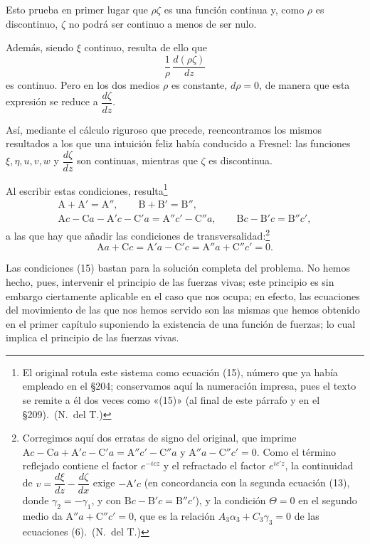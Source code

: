 Esto prueba en primer lugar que $\rho\zeta$ es una función continua y,
como $\rho$ es discontinuo, $\zeta$ no podrá ser continuo a menos de ser
nulo.

Además, siendo $\xi$ continuo, resulta de ello que
\[
\frac{1}{\rho}\,\frac{d(\rho\zeta)}{dz}
\]
es continuo. Pero en los dos medios $\rho$ es constante, $d\rho=0$, de
manera que esta expresión se reduce a $\dfrac{d\zeta}{dz}$.

Así, mediante el cálculo riguroso que precede, reencontramos los mismos
resultados a los que una intuición feliz había conducido a Fresnel: las
funciones $\xi,\eta,u,v,w$ y $\dfrac{d\zeta}{dz}$ son continuas, mientras
que $\zeta$ es discontinua.

Al escribir estas condiciones, resulta\footnote{El original rotula este
sistema como ecuación (15), número que ya había empleado en el §204;
conservamos aquí la numeración impresa, pues el texto se remite a él dos
veces como «(15)» (al final de este párrafo y en el §209).~(N.~del T.)}
\begin{equation}
\begin{gathered}
\mathrm{A}+\mathrm{A}'=\mathrm{A}'',\qquad \mathrm{B}+\mathrm{B}'=\mathrm{B}'',\\
\mathrm{A}c-\mathrm{C}a-\mathrm{A}'c-\mathrm{C}'a=\mathrm{A}''c'-\mathrm{C}''a,
\qquad \mathrm{B}c-\mathrm{B}'c=\mathrm{B}''c',
\end{gathered}
\tag{15}
\end{equation}
a las que hay que añadir las condiciones de transversalidad:\footnote{Corregimos
aquí dos erratas de signo del original, que imprime
$\mathrm{A}c-\mathrm{C}a+\mathrm{A}'c-\mathrm{C}'a=\mathrm{A}''c'-\mathrm{C}''a$
y $\mathrm{A}''a-\mathrm{C}''c'=0$. Como el término reflejado contiene el
factor $e^{-icz}$ y el refractado el factor $e^{ic'z}$, la continuidad de
$v=\dfrac{d\xi}{dz}-\dfrac{d\zeta}{dx}$ exige $-\mathrm{A}'c$ (en
concordancia con la segunda ecuación (13), donde $\gamma_2=-\gamma_1$, y
con $\mathrm{B}c-\mathrm{B}'c=\mathrm{B}''c'$), y la condición
$\Theta=0$ en el segundo medio da $\mathrm{A}''a+\mathrm{C}''c'=0$, que
es la relación $A_3\alpha_3+C_3\gamma_3=0$ de las ecuaciones (6).~(N.~del T.)}
\[
\mathrm{A}a+\mathrm{C}c=\mathrm{A}'a-\mathrm{C}'c=\mathrm{A}''a+\mathrm{C}''c'=0.
\]

Las condiciones (15) bastan para la solución completa del problema. No
hemos hecho, pues, intervenir el principio de las fuerzas vivas; este
principio es sin embargo ciertamente aplicable en el caso que nos ocupa;
en efecto, las ecuaciones del movimiento de las que nos hemos servido son
las mismas que hemos obtenido en el primer capítulo suponiendo la
existencia de una función de fuerzas; lo cual implica el principio de
las fuerzas vivas.

